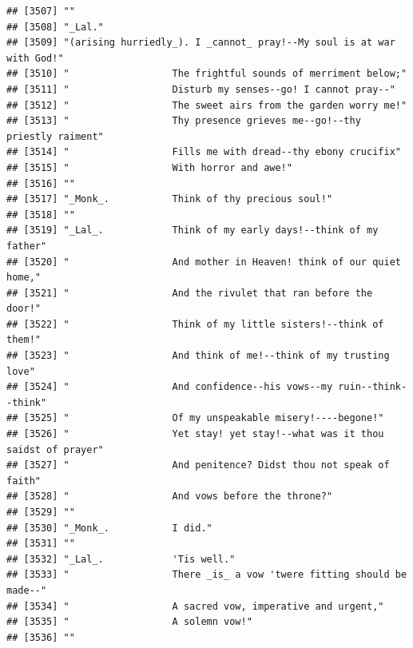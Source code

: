 \documentclass{article}\usepackage[]{graphicx}\usepackage[]{color}
\makeatletter
\newenvironment{kframe}{%
 \def\at@end@of@kframe{}%
 \ifinner\ifhmode%
  \def\at@end@of@kframe{\end{minipage}}%
  \begin{minipage}{\columnwidth}%
 \fi\fi%
 \def\FrameCommand##1{\hskip\@totalleftmargin \hskip-\fboxsep
 \colorbox{shadecolor}{##1}\hskip-\fboxsep
     \hskip-\linewidth \hskip-\@totalleftmargin \hskip\columnwidth}%
 \MakeFramed {\advance\hsize-\width
   \@totalleftmargin\z@ \linewidth\hsize
   \@setminipage}}%
 {\par\unskip\endMakeFramed%
 \at@end@of@kframe}
\newenvironment{knitrout}{}{} %
\makeatother
\begin{document}
\begin{knitrout}
\begin{kframe}
\begin{verbatim}
## [3507] ""                                                                            
## [3508] "_Lal."                                                                       
## [3509] "(arising hurriedly_). I _cannot_ pray!--My soul is at war with God!"         
## [3510] "                  The frightful sounds of merriment below;"                  
## [3511] "                  Disturb my senses--go! I cannot pray--"                    
## [3512] "                  The sweet airs from the garden worry me!"                  
## [3513] "                  Thy presence grieves me--go!--thy priestly raiment"        
## [3514] "                  Fills me with dread--thy ebony crucifix"                   
## [3515] "                  With horror and awe!"                                      
## [3516] ""                                                                            
## [3517] "_Monk_.           Think of thy precious soul!"                               
## [3518] ""                                                                            
## [3519] "_Lal_.            Think of my early days!--think of my father"               
## [3520] "                  And mother in Heaven! think of our quiet home,"            
## [3521] "                  And the rivulet that ran before the door!"                 
## [3522] "                  Think of my little sisters!--think of them!"               
## [3523] "                  And think of me!--think of my trusting love"               
## [3524] "                  And confidence--his vows--my ruin--think--think"           
## [3525] "                  Of my unspeakable misery!----begone!"                      
## [3526] "                  Yet stay! yet stay!--what was it thou saidst of prayer"    
## [3527] "                  And penitence? Didst thou not speak of faith"              
## [3528] "                  And vows before the throne?"                               
## [3529] ""                                                                            
## [3530] "_Monk_.           I did."                                                    
## [3531] ""                                                                            
## [3532] "_Lal_.            'Tis well."                                                
## [3533] "                  There _is_ a vow 'twere fitting should be made--"          
## [3534] "                  A sacred vow, imperative and urgent,"                      
## [3535] "                  A solemn vow!"                                             
## [3536] ""                                                                            

\end{verbatim}
\end{kframe}
\end{knitrout}
\end{document}
